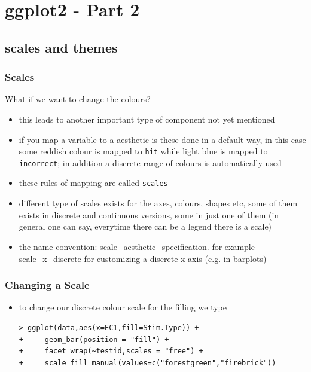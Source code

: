 \documentclass[xcolor={table},c]{beamer}
\begin{document}
\section{ggplot2 - Part 2}
\subsection{scales and themes}

\begin{frame}[fragile]\frametitle{Scales}
What if we want to change the colours?
\begin{itemize}
\item this leads to another important type of component not yet mentioned
\item if you map a variable to a aesthetic is these done in a default way, in this case some reddish colour is mapped to \texttt{hit} while light blue is mapped to \texttt{incorrect}; in addition a discrete range of colours is automatically used
\item these rules of mapping are called \texttt{scales}
\item different type of scales exists for the axes, colours, shapes etc, some of them exists in discrete and continuous versions, some in just one of them (in general one can say, everytime there can be a legend there is a scale)
\item the name convention: scale\_aesthetic\_specification. for example scale\_x\_discrete for customizing a discrete x axis (e.g. in barplots)
\end{itemize}
\end{frame}


\begin{frame}[fragile]\frametitle{Changing a Scale}
  \begin{itemize}
  \item to change our discrete colour scale for the filling we type \footnotesize
\begin{verbatim}
> ggplot(data,aes(x=EC1,fill=Stim.Type)) +
+     geom_bar(position = "fill") +
+     facet_wrap(~testid,scales = "free") +
+     scale_fill_manual(values=c("forestgreen","firebrick"))
\end{verbatim}
  \end{itemize}
\begin{center}
\end{center}
\end{frame}
\end{document}
